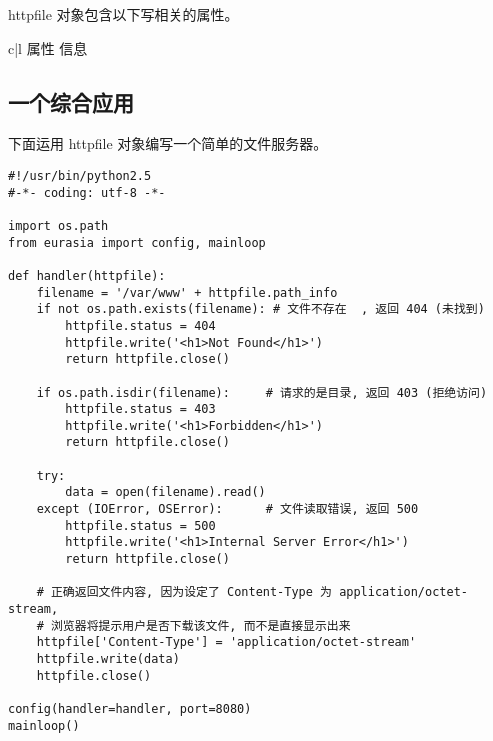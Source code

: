 \documentclass{manual}
\begin{document}
httpfile 对象包含以下写相关的属性。

\begin{tableii}{c|l}{}{ 属性 }{ 信息 }
\end{tableii}


\subsection{一个综合应用}

下面运用 httpfile 对象编写一个简单的文件服务器。


\begin{verbatim}
#!/usr/bin/python2.5
#-*- coding: utf-8 -*-

import os.path
from eurasia import config, mainloop

def handler(httpfile):
	filename = '/var/www' + httpfile.path_info
	if not os.path.exists(filename): # 文件不存在  , 返回 404 (未找到)
		httpfile.status = 404
		httpfile.write('<h1>Not Found</h1>')
		return httpfile.close()

	if os.path.isdir(filename):     # 请求的是目录, 返回 403 (拒绝访问)
		httpfile.status = 403
		httpfile.write('<h1>Forbidden</h1>')
		return httpfile.close()

	try:
		data = open(filename).read()
	except (IOError, OSError):      # 文件读取错误, 返回 500
		httpfile.status = 500
		httpfile.write('<h1>Internal Server Error</h1>')
		return httpfile.close()

	# 正确返回文件内容, 因为设定了 Content-Type 为 application/octet-stream,
	# 浏览器将提示用户是否下载该文件, 而不是直接显示出来
	httpfile['Content-Type'] = 'application/octet-stream'
	httpfile.write(data)
	httpfile.close()

config(handler=handler, port=8080)
mainloop()
\end{verbatim}
\end{document}
